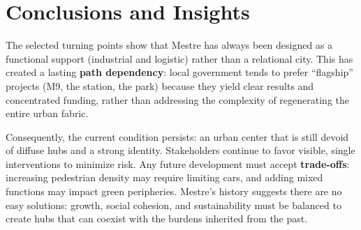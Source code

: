 \documentclass[a4paper,11pt]{article}
\begin{document}
\section*{Conclusions and Insights}
The selected turning points show that Mestre has always been designed as a functional support (industrial and logistic) rather than a relational city. This has created a lasting \textbf{path dependency}: local government tends to prefer ``flagship'' projects (M9, the station, the park) because they yield clear results and concentrated funding, rather than addressing the complexity of regenerating the entire urban fabric.

Consequently, the current condition persists: an urban center that is still devoid of diffuse hubs and a strong identity. Stakeholders continue to favor visible, single interventions to minimize risk. Any future development must accept \textbf{trade-offs}: increasing pedestrian density may require limiting cars, and adding mixed functions may impact green peripheries. Mestre's history suggests there are no easy solutions: growth, social cohesion, and sustainability must be balanced to create hubs that can coexist with the burdens inherited from the past.
\end{document}
